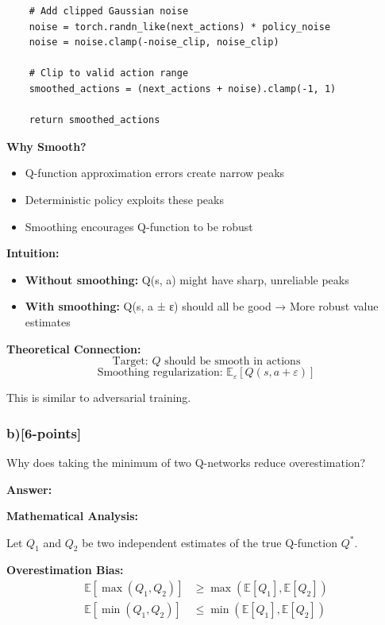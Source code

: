 \documentclass[12pt]{article}
\begin{document}
{{\begin{verbatim}
    # Add clipped Gaussian noise
    noise = torch.randn_like(next_actions) * policy_noise
    noise = noise.clamp(-noise_clip, noise_clip)
    
    # Clip to valid action range
    smoothed_actions = (next_actions + noise).clamp(-1, 1)
    
    return smoothed_actions
\end{verbatim}

\textbf{Why Smooth?}
\begin{itemize}
\item Q-function approximation errors create narrow peaks
\item Deterministic policy exploits these peaks
\item Smoothing encourages Q-function to be robust
\end{itemize}

\textbf{Intuition:}
\begin{itemize}
\item \textbf{Without smoothing:} Q(s, a) might have sharp, unreliable peaks
\item \textbf{With smoothing:} Q(s, a ± ε) should all be good → More robust value estimates
\end{itemize}

\textbf{Theoretical Connection:}
\begin{equation}
\text{Target: } Q \text{ should be smooth in actions}
\end{equation}
\begin{equation}
\text{Smoothing regularization: } \mathbb{E}_\varepsilon[Q(s, a + \varepsilon)]
\end{equation}

This is similar to adversarial training.

\subsubsection{b)[6-points]} Why does taking the minimum of two Q-networks reduce overestimation?

\textbf{Answer:}

\textbf{Mathematical Analysis:}

Let $Q_1$ and $Q_2$ be two independent estimates of the true Q-function $Q^*$.

\textbf{Overestimation Bias:}
\begin{align}
\mathbb{E}[\max(Q_1, Q_2)] &\geq \max(\mathbb{E}[Q_1], \mathbb{E}[Q_2]) \\
\mathbb{E}[\min(Q_1, Q_2)] &\leq \min(\mathbb{E}[Q_1], \mathbb{E}[Q_2])
\end{align}

}}
\end{document}
